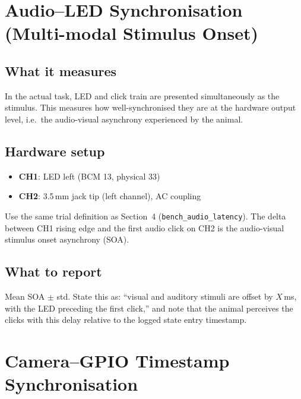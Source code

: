 \documentclass[11pt, a4paper]{article}
\begin{document}
\newpage

\section{Audio--LED Synchronisation (Multi-modal Stimulus Onset)}

\subsection*{What it measures}

In the actual task, LED and click train are presented simultaneously as the
stimulus. This measures how well-synchronised they are at the hardware output
level, i.e.\ the audio-visual asynchrony experienced by the animal.

\subsection*{Hardware setup}

\begin{itemize}[noitemsep]
    \item \textbf{CH1}: LED left (BCM 13, physical 33)
    \item \textbf{CH2}: 3.5\,mm jack tip (left channel), AC coupling
\end{itemize}

Use the same trial definition as Section~4 (\texttt{bench\_audio\_latency}).
The delta between CH1 rising edge and the first audio click on CH2 is the
audio-visual stimulus onset asynchrony (SOA).

\subsection*{What to report}

Mean SOA $\pm$ std. State this as: ``visual and auditory stimuli are offset by
$X$\,ms, with the LED preceding the first click,'' and note that the animal
perceives the clicks with this delay relative to the logged state entry
timestamp.

\newpage

\section{Camera--GPIO Timestamp Synchronisation}
\end{document}
